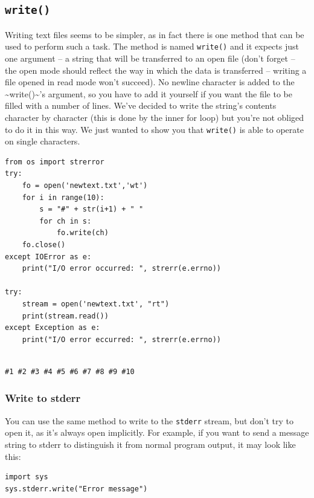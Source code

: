 \documentclass[11pt]{article}
\begin{document}
\subsection{\texttt{write()}}
\label{sec:orgd38405a}
Writing text files seems to be simpler, as in fact there is one method
that can be used to perform such a task.  The method is named
\texttt{write()} and it expects just one argument – a string that will be
transferred to an open file (don’t forget – the open mode should
reflect the way in which the data is transferred – writing a file
opened in read mode won’t succeed).  No newline character is added to
the \textasciitilde{}write()\textasciitilde{}’s argument, so you have to add it yourself if you want
the file to be filled with a number of lines. We’ve decided to write
the string’s contents character by character (this is done by the
inner for loop) but you’re not obliged to do it in this way. We just
wanted to show you that \texttt{write()} is able to operate on single
characters.

\begin{verbatim}
from os import strerror
try:
	fo = open('newtext.txt','wt')
	for i in range(10):
		s = "#" + str(i+1) + " "
		for ch in s:
			fo.write(ch)
	fo.close()
except IOError as e:
	print("I/O error occurred: ", strerr(e.errno))

try:
    stream = open('newtext.txt', "rt")
    print(stream.read())
except Exception as e:
	print("I/O error eccurred: ", strerr(e.errno))


\end{verbatim}

\begin{verbatim}
#1 #2 #3 #4 #5 #6 #7 #8 #9 #10 
\end{verbatim}

\subsubsection{Write to stderr}
\label{sec:org0ae8584}
You can use the same method to write to the \texttt{stderr} stream, but
don’t try to open it, as it’s always open implicitly. For example, if
you want to send a message string to stderr to distinguish it from
normal program output, it may look like this:

\begin{verbatim}
import sys
sys.stderr.write("Error message")
\end{verbatim}


\newpage
\end{document}
